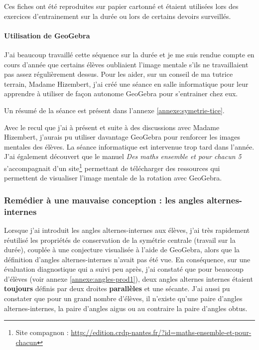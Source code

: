 Ces fiches ont été reproduites sur papier cartonné et étaient utilisées lors des exercices d'entrainement sur la durée ou lors de certains devoirs surveillés.

\paragraph{Utilisation de GeoGebra}

J'ai beaucoup travaillé cette séquence sur la durée et je me suis rendue compte en cours d'année que certains élèves oubliaient l'image mentale s'ils ne travaillaient pas assez régulièrement dessus. Pour les aider, sur un conseil de ma tutrice terrain, Madame Hizembert, j'ai créé une séance en salle informatique pour leur apprendre à utiliser de façon autonome GeoGebra pour s'entrainer chez eux.

Un résumé de la séance est présent dans l'annexe \ref{annexe:symetrie-tice}.

Avec le recul que j'ai à présent et suite à des discussions avec Madame Hizembert, j'aurais pu utiliser davantage GeoGebra pour renforcer les images mentales des élèves. La séance informatique est intervenue trop tard dans l'année. J'ai également découvert que le manuel \textit{Des maths ensemble et pour chacun 5} s'accompagnait d'un site\footnote{Site compagnon : \url{http://edition.crdp-nantes.fr/?id=maths-ensemble-et-pour-chacun}} permettant de télécharger des ressources qui permettent de visualiser l'image mentale de la rotation avec GeoGebra.

\subsubsection{Remédier à une mauvaise conception : les angles alternes-internes}

Lorsque j'ai introduit les angles alternes-internes aux élèves, j'ai très rapidement réutilisé les propriétés de conservation de la symétrie centrale (travail sur la durée), couplée à une conjecture visualisée à l'aide de GeoGebra, alors que la définition d'angles alternes-internes n'avait pas été vue. En conséquence, sur une évaluation diagnostique qui a suivi peu après, j'ai constaté que pour beaucoup d'élèves (voir annexe \ref{annexe:angles-prod1}), deux angles alternes internes étaient \textbf{toujours} définis par deux droites \textbf{parallèles} et une sécante. J'ai aussi pu constater que pour un grand nombre d'élèves, il n'existe qu'une paire d'angles alternes-internes, la paire d'angles aigus ou au contraire la paire d'angles obtus.

